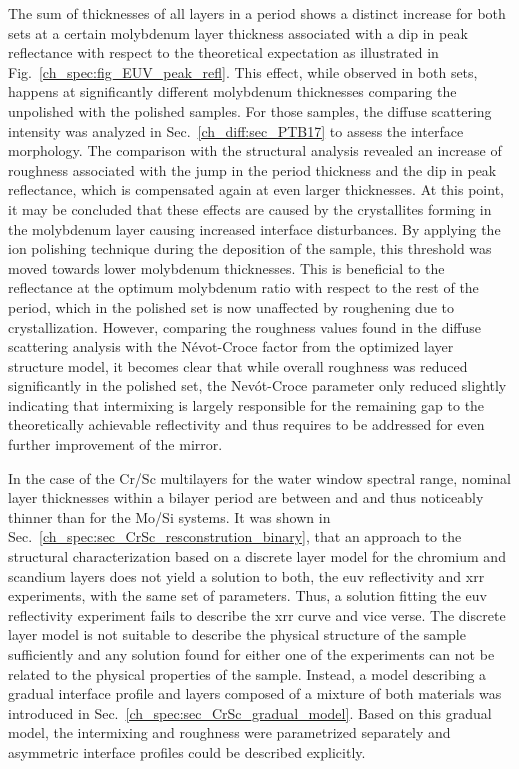 The sum of thicknesses of all layers in a period shows a distinct increase for both sets at a certain molybdenum layer thickness associated with a dip in peak reflectance with respect to the theoretical expectation as illustrated in Fig.~\ref{ch_spec:fig_EUV_peak_refl}. This effect, while observed in both sets, happens at significantly different molybdenum thicknesses comparing the unpolished with the polished samples. For those samples, the diffuse scattering intensity was analyzed in Sec.~\ref{ch_diff:sec_PTB17} to assess the interface morphology. The comparison with the structural analysis revealed an increase of roughness associated with the jump in the period thickness and the dip in peak reflectance, which is compensated again at even larger thicknesses. At this point, it may be concluded that these effects are caused by the crystallites forming in the molybdenum layer causing increased interface disturbances. By applying the ion polishing technique during the deposition of the sample, this threshold was moved towards lower molybdenum thicknesses. This is beneficial to the reflectance at the optimum molybdenum ratio with respect to the rest of the period, which in the polished set is now unaffected by roughening due to crystallization. However, comparing the roughness values found in the diffuse scattering analysis with the N{\'e}vot-Croce factor from the optimized layer structure model, it becomes clear that while overall roughness was reduced significantly in the polished set, the Nev{\'o}t-Croce parameter only reduced slightly indicating that intermixing is largely responsible for the remaining gap to the theoretically achievable reflectivity and thus requires to be addressed for even further improvement of the mirror.

In the case of the Cr/Sc multilayers for the water window spectral range, nominal layer thicknesses within a bilayer period are between  and  and thus noticeably thinner than for the Mo/Si systems. It was shown in Sec.~\ref{ch_spec:sec_CrSc_resconstrution_binary}, that an approach to the structural characterization based on a discrete layer model for the chromium and scandium layers does not yield a solution to both, the \gls{euv} reflectivity and \gls{xrr} experiments, with the same set of parameters. Thus, a solution fitting the \gls{euv} reflectivity experiment fails to describe the \gls{xrr} curve and vice verse. The discrete layer model is not suitable to describe the physical structure of the sample sufficiently and any solution found for either one of the experiments can not be related to the physical properties of the sample. Instead, a model describing a gradual interface profile and layers composed of a mixture of both materials was introduced in Sec.~\ref{ch_spec:sec_CrSc_gradual_model}. Based on this gradual model, the intermixing and roughness were parametrized separately and asymmetric interface profiles could be described explicitly.

